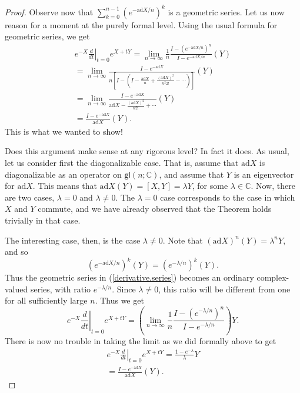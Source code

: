 \documentclass[12pt]{amsbook}
\theoremstyle{plain}
\numberwithin{equation}{chapter}
\numberwithin{theorem}{chapter}
\begin{document}
\begin{proof}
Observe now that $\sum_{k=0}^{n-1}\left(  e^{-\mathrm{ad}X/n}\right)  ^{k}$ is
a geometric series. Let us now reason for a moment at the purely formal level.
Using the usual formula for geometric series, we get
\begin{align*}
e^{-X}\left.  \frac{d}{dt}\right|  _{t=0}e^{X+tY}=\lim_{n\rightarrow\infty
}\frac{1}{n}\frac{I-\left(  e^{-\mathrm{ad}X/n}\right)  ^{n}}%
{I-e^{-\mathrm{ad}X/n}}(Y)\\
=\lim_{n\rightarrow\infty}\frac{I-e^{-\mathrm{ad}X}}{n\left[  I-\left(
I-\frac{\mathrm{ad}X}{n}+\frac{(\mathrm{ad}X)^{2}}{n^{2}2!}-\cdots\right)
\right]  }(Y)\\
=\lim_{n\rightarrow\infty}\frac{I-e^{-\mathrm{ad}X}}{\mathrm{ad}%
X-\frac{(\mathrm{ad}X)^{2}}{n2!}+\cdots}(Y)\\
=\frac{I-e^{-\mathrm{ad}X}}{\mathrm{ad}X}(Y)\text{.}%
\end{align*}
This is what we wanted to show!

Does this argument make sense at any rigorous level? In fact it does. As
usual, let us consider first the diagonalizable case. That is, assume that
$\mathrm{ad}X$ is diagonalizable as an operator on $\mathsf{gl}(n;\mathbb{C}%
)$, and assume that $Y$ is an eigenvector for $\mathrm{ad}X$. This means that
$\mathrm{ad}X(Y)=[X,Y]=\lambda Y$, for some $\lambda\in\mathbb{C}$. Now, there
are two cases, $\lambda=0$ and $\lambda\neq0$. The $\lambda=0$ case
corresponds to the case in which $X$ and $Y$ commute, and we have already
observed that the Theorem holds trivially in that case.

The interesting case, then, is the case $\lambda\neq0$. Note that $\left(
\mathrm{ad}X\right)  ^{n}(Y)=\lambda^{n}Y$, and so
\[
\left(  e^{-\mathrm{ad}X/n}\right)  ^{k}(Y)=\left(  e^{-\lambda/n}\right)
^{k}(Y)\text{.}%
\]
Thus the geometric series in (\ref{derivative.series}) becomes an ordinary
complex-valued series, with ratio $e^{-\lambda/n}$. Since $\lambda\neq0$, this
ratio will be different from one for all sufficiently large $n$. Thus we get
\[
e^{-X}\left.  \frac{d}{dt}\right|  _{t=0}e^{X+tY}=\left(  \lim_{n\rightarrow
\infty}\frac{1}{n}\frac{I-\left(  e^{-\lambda/n}\right)  ^{n}}{I-e^{-\lambda
/n}}\right)  Y\text{.}%
\]
There is now no trouble in taking the limit as we did formally above to get
\begin{align*}
e^{-X}\left.  \frac{d}{dt}\right|  _{t=0}e^{X+tY}=\frac{1-e^{-\lambda}%
}{\lambda}Y\\
=\frac{I-e^{-\mathrm{ad}X}}{\mathrm{ad}X}(Y)\text{.}%
\end{align*}


\end{proof}
\end{document}
